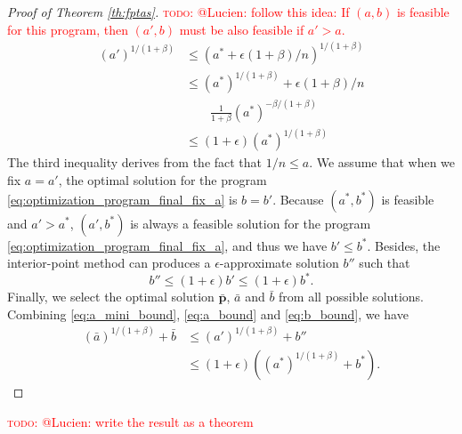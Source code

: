 \documentclass[letterpaper]{article} %
\newcommand{\probdistri}{\mathbf{p}}
\newcommand{\complexbound}{\beta}
\newcommand{\red}[1]{\textcolor{red}{#1}}
\newcommand{\todo}[1]{\red{\textsc{todo:} #1}}
\newcommand{\citep}[3]{(#1\ \citeauthor{#3}\ \citeyear{#3},\ #2)}
\begin{document}
\begin{proof}[Proof of Theorem \ref{th:fptas}]
  \todo{@Lucien: follow this idea: If $(a,b)$ is feasible for this program, then $(a',b)$ must be also feasible if $a'>a$.  }
  \begin{equation}
  \label{eq:a_bound}
  \begin{aligned}
    (a')^{1/(1+\complexbound{})}&\le (a^*+\epsilon(1+\beta)/n)^{1/(1+\complexbound{})}\\
    &\le (a^*)^{1/(1+\complexbound{})} + \epsilon(1+\beta)/n\\
    &\qquad\frac{1}{1+\complexbound{}}(a^*)^{-\complexbound{}/(1+\complexbound{})}\\
    &\le (1+\epsilon)(a^*)^{1/(1+\complexbound{})}
  \end{aligned}
  \end{equation}
  The third inequality derives from the fact that $1/n\le a$.
  We assume that when we fix $a=a'$, the optimal solution for the program \eqref{eq:optimization_program_final_fix_a} is $b=b'$.
  Because $(a^*,b^*)$ is feasible and $a'>a^*$, $(a', b^*)$ is always a feasible solution for the program \eqref{eq:optimization_program_final_fix_a}, and thus we have $b'\le b^*$.
  Besides, the interior-point method can produces a $\epsilon$-approximate solution $b''$ such that
  \begin{equation}
    \label{eq:b_bound}
    b''\le (1+\epsilon)b'\le (1+\epsilon)b^*.
  \end{equation}
  Finally, we select the optimal solution $\bar{\probdistri{}}$, $\bar{a}$ and $\bar{b}$ from all possible solutions. 
  Combining \eqref{eq:a_mini_bound}, \eqref{eq:a_bound} and \eqref{eq:b_bound}, we have
  \begin{align*}
    (\bar{a})^{1/(1+\complexbound{})} + \bar{b} & \le (a')^{1/(1+\complexbound{})} + b''\\
    &\le (1+\epsilon)((a^*)^{1/(1+\complexbound{})} + b^*).
  \end{align*}
\end{proof}

\todo{@Lucien: write the result as a theorem}


\end{document}
